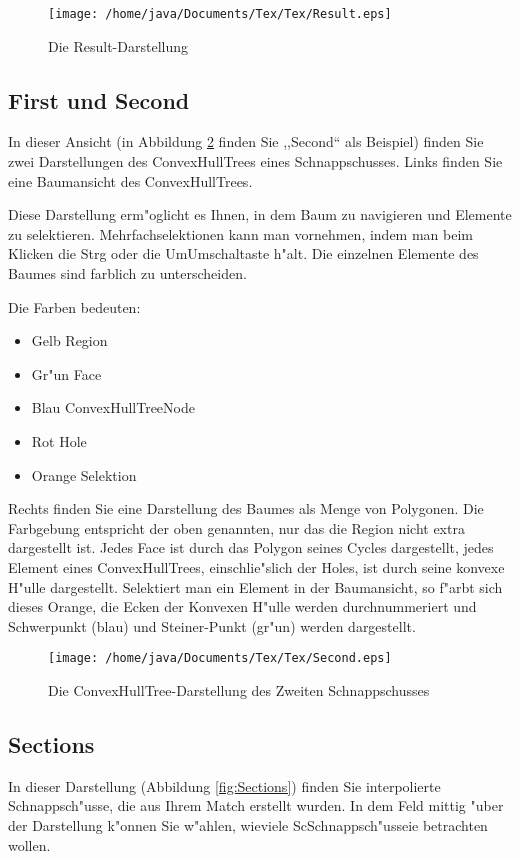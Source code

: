 \begin{figure}
   \centering
   \texttt{[image: /home/java/Documents/Tex/Tex/Result.eps]}
   \caption{Die Result-Darstellung}
   \label{fig:Result}
\end{figure}
\subsection{First und Second}
In dieser Ansicht (in Abbildung \ref{fig:Second} finden Sie ,,Second`` als Beispiel) finden Sie zwei Darstellungen des ConvexHullTrees eines Schnappschusses. Links finden Sie eine Baumansicht des ConvexHullTrees.

Diese Darstellung erm"oglicht es Ihnen, in dem Baum zu navigieren und Elemente zu selektieren. Mehrfachselektionen kann man vornehmen, indem man beim Klicken die Strg oder die UmUmschaltaste h"alt. Die einzelnen Elemente des Baumes sind farblich zu unterscheiden.

Die Farben bedeuten:
\begin{itemize}
\item Gelb Region
\item Gr"un Face
\item Blau ConvexHullTreeNode
\item Rot Hole
\item Orange Selektion
\end{itemize} 

Rechts finden Sie eine Darstellung des Baumes als Menge von Polygonen. Die Farbgebung entspricht der oben genannten, nur das die Region nicht extra dargestellt ist. Jedes Face ist durch das Polygon seines Cycles dargestellt, jedes Element eines ConvexHullTrees, einschlie"slich der Holes, ist durch seine konvexe H"ulle dargestellt. Selektiert man ein Element in der Baumansicht, so f"arbt sich dieses Orange, die Ecken der Konvexen H"ulle werden durchnummeriert und Schwerpunkt (blau) und Steiner-Punkt (gr"un) werden dargestellt.

\begin{figure}
   \centering
   \texttt{[image: /home/java/Documents/Tex/Tex/Second.eps]}
   \caption{Die ConvexHullTree-Darstellung des Zweiten Schnappschusses}
   \label{fig:Second}
\end{figure}
\subsection{Sections}
In dieser Darstellung (Abbildung \ref{fig:Sections}) finden Sie interpolierte Schnappsch"usse, die aus Ihrem Match erstellt wurden. In dem Feld mittig "uber der Darstellung k"onnen Sie w"ahlen, wieviele ScSchnappsch"usseie betrachten wollen. 

